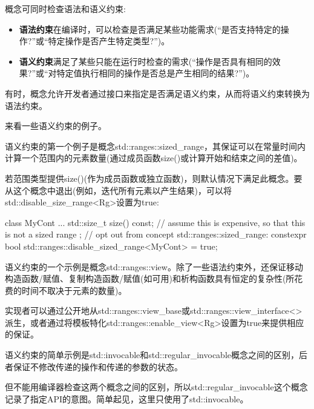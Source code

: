 
概念可同时检查语法和语义约束:

\begin{itemize}
\item
\textbf{语法约束}在编译时，可以检查是否满足某些功能需求(“是否支持特定的操作?”或“特定操作是否产生特定类型?”)。

\item
\textbf{语义约束}满足了某些只能在运行时检查的需求(“操作是否具有相同的效果?”或“对特定值执行相同的操作是否总是产生相同的结果?”)。
\end{itemize}

有时，概念允许开发者通过接口来指定是否满足语义约束，从而将语义约束转换为语法约束。


来看一些语义约束的例子。


语义约束的第一个例子是概念std::ranges::sized\_range，其保证可以在常量时间内计算一个范围内的元素数量(通过成员函数size()或计算开始和结束之间的差值)。

若范围类型提供size()(作为成员函数或独立函数)，则默认情况下满足此概念。要从这个概念中退出(例如，迭代所有元素以产生结果)，可以将std::disable\_size\_range<Rg>设置为true:

\begin{cpp}
class MyCont {
	...
	std::size_t size() const; // assume this is expensive, so that this is not a sized range
};
// opt out from concept std::ranges::sized_range:
constexpr bool std::ranges::disable_sized_range<MyCont> = true;
\end{cpp}


语义约束的一个示例是概念std::ranges::view。除了一些语法约束外，还保证移动构造函数/赋值、复制构造函数/赋值(如可用)和析构函数具有恒定的复杂性(所花费的时间不取决于元素的数量)。

实现者可以通过公开地从std::ranges::view\_base或std::ranges::view\_interface<>派生，或者通过将模板特化std::ranges::enable\_view<Rg>设置为true来提供相应的保证。


语义约束的简单示例是std::invocable和std::regular\_invocable概念之间的区别，后者保证不修改传递的操作和传递的参数的状态。

但不能用编译器检查这两个概念之间的区别，所以std::regular\_invocable这个概念记录了指定API的意图。简单起见，这里只使用了std::invocable。

